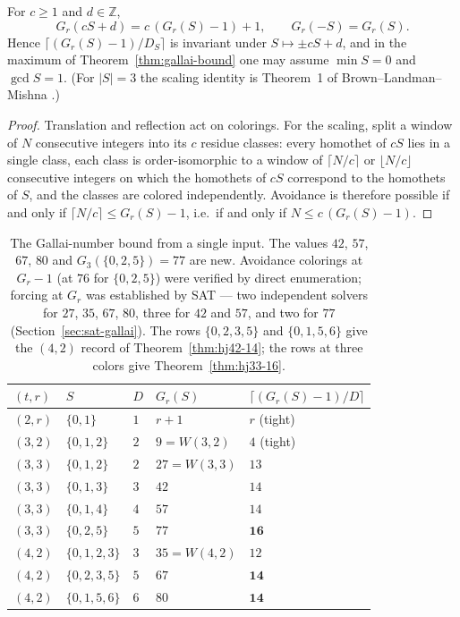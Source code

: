 \documentclass[12pt]{article}
\newcommand{\Wvdw}{W}
\newcommand{\Z}{\mathbb{Z}}
\begin{document}
\begin{lemma}\label{lem:affine-G}
For $c\ge 1$ and $d\in\Z$,
\[
G_{r}(cS+d)=c\,(G_{r}(S)-1)+1,
\qquad
G_{r}(-S)=G_{r}(S).
\]
Hence $\lceil(G_{r}(S)-1)/D_{S}\rceil$ is invariant under
$S\mapsto\pm cS+d$, and in the maximum of
Theorem~\ref{thm:gallai-bound} one may assume $\min S=0$ and
$\gcd S=1$. \textup{(}For $|S|=3$ the scaling identity is Theorem~1 of
Brown--Landman--Mishna \cite{BrownLandmanMishna1997}.\textup{)}
\end{lemma}

\begin{proof}
Translation and reflection act on colorings. For the scaling, split a
window of $N$ consecutive integers into its $c$ residue classes: every
homothet of $cS$ lies in a single class, each class is order-isomorphic
to a window of $\lceil N/c\rceil$ or $\lfloor N/c\rfloor$ consecutive
integers on which the homothets of $cS$ correspond to the homothets of
$S$, and the classes are colored independently. Avoidance is therefore
possible if and only if $\lceil N/c\rceil\le G_{r}(S)-1$, i.e.\ if and
only if $N\le c\,(G_{r}(S)-1)$.
\end{proof}

\begin{table}[ht]
\centering
\caption{The Gallai-number bound from a single input. The values $42$,
$57$, $67$, $80$ and $G_{3}(\{0,2,5\})=77$ are new.
Avoidance colorings at $G_{r}-1$ (at $76$ for $\{0,2,5\}$) were
verified by direct enumeration; forcing at $G_{r}$ was established by
SAT --- two independent solvers for $27$, $35$, $67$, $80$, three for
$42$ and $57$, and two for $77$
(Section~\ref{sec:sat-gallai}). The rows $\{0,2,3,5\}$ and $\{0,1,5,6\}$ give the
$(4,2)$ record of Theorem~\ref{thm:hj42-14}; the rows at three colors
give Theorem~\ref{thm:hj33-16}.}
\label{tab:gallai}
\begin{tabular}{@{}lllll@{}}
\toprule
$(t,r)$ & $S$ & $D$ & $G_{r}(S)$ & $\lceil(G_{r}(S)-1)/D\rceil$\\
\midrule
$(2,r)$ & $\{0,1\}$     & $1$ & $r+1$          & $r$ \;(tight)\\
$(3,2)$ & $\{0,1,2\}$   & $2$ & $9=\Wvdw(3,2)$  & $4$ \;(tight)\\
$(3,3)$ & $\{0,1,2\}$   & $2$ & $27=\Wvdw(3,3)$ & $13$\\
$(3,3)$ & $\{0,1,3\}$   & $3$ & $42$           & $14$\\
$(3,3)$ & $\{0,1,4\}$   & $4$ & $57$           & $14$\\
$(3,3)$ & $\{0,2,5\}$   & $5$ & $77$           & $\mathbf{16}$\\
$(4,2)$ & $\{0,1,2,3\}$ & $3$ & $35=\Wvdw(4,2)$ & $12$\\
$(4,2)$ & $\{0,2,3,5\}$ & $5$ & $67$           & $\mathbf{14}$\\
$(4,2)$ & $\{0,1,5,6\}$ & $6$ & $80$           & $\mathbf{14}$\\
\bottomrule
\end{tabular}
\end{table}
\end{document}
